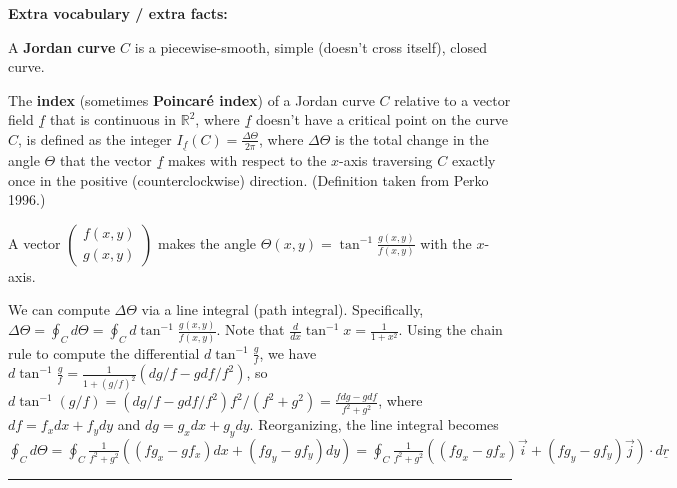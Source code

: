 \documentclass[12pt,letterpaper,noanswers]{exam}
\begin{document}
\noindent \textbf{Extra vocabulary / extra facts:}
\begin{tcolorbox}
A \textbf{Jordan curve} $C$ is a piecewise-smooth, simple (doesn't cross itself), closed curve.

The \textbf{index} (sometimes \textbf{Poincar\'e index}) of a Jordan curve $C$ relative to a vector field $\underline{f}$ that is continuous in $\mathbb{R}^2$, where $\underline f$ doesn't have a critical point on the curve $C$, is defined as the integer $I_{\underline f}(C) = \frac{\Delta \Theta}{2\pi}$, where $\Delta\Theta$ is the total change in the angle $\Theta$ that the vector $\underline f$ makes with respect to the $x$-axis traversing $C$ exactly once in the positive (counterclockwise) direction. (Definition taken from Perko 1996.)

A vector $\left(\begin{array}{c} f(x,y) \\ g(x,y) \end{array}\right)$ makes the angle $\Theta(x,y) = \tan^{-1} \frac{g(x,y)}{f(x,y)}$ with the $x$-axis.
\end{tcolorbox}
\begin{tcolorbox}
We can compute $\Delta\Theta$ via a line integral (path integral).  Specifically, $\displaystyle \Delta\Theta = \oint_C d\Theta = \oint_C d\tan^{-1}\frac{g(x,y)}{f(x,y)}$.  Note that $\frac{d}{dx}\tan^{-1} x = \frac{1}{1+x^2}$.  Using the chain rule to compute the differential $d\tan^{-1}\frac{g}{f}$, we have $d\tan^{-1}\frac{g}{f} = \frac{1}{1+(g/f)^2}\left(dg/f -gdf/f^2\right)$, so $\displaystyle d\tan^{-1}(g/f) = (dg/f - gdf/f^2)f^2/(f^2+g^2)= \frac{fdg - gdf}{f^2+g^2}$, where $df = f_x dx + f_ydy$ and $dg = g_xdx + g_ydy$.  Reorganizing, the line integral becomes $\displaystyle\oint_C d\Theta = \oint_C \frac{1}{f^2+g^2}\left((fg_x-gf_x)dx+(fg_y-gf_y)dy\right) = \oint_C \frac{1}{f^2+g^2}((fg_x-gf_x)\vec i +(fg_y-gf_y)\vec j)\cdot d\underline r$

\end{tcolorbox}



\vspace{0.2cm}
\hrule
\vspace{0.2cm}
\end{document}
